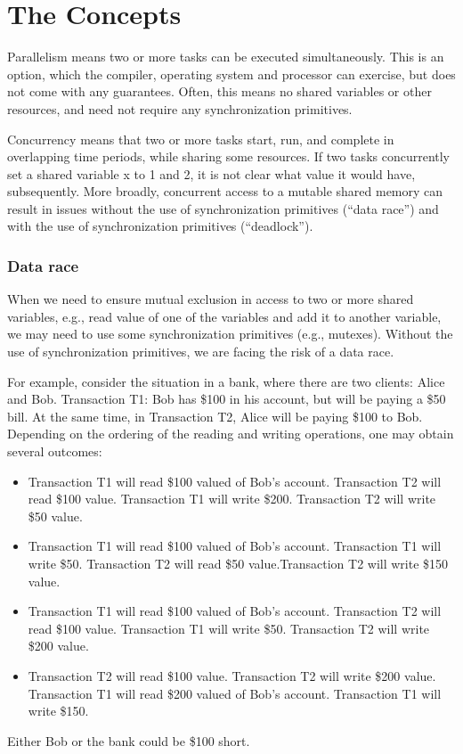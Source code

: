 \chapter{The Concepts}
\label{ch:concepts}

Parallelism means two or more tasks can be executed simultaneously. This is an option, which the compiler, operating system and processor can exercise, but does not come with any guarantees. 
Often, this means no shared variables or other resources, and need not require any synchronization primitives.

Concurrency means that two or more tasks start, run, and complete in overlapping time periods, while sharing some resources. 
If two tasks concurrently set a shared variable x to 1 and 2, it is not clear what value it would have, subsequently.
More broadly, concurrent access to a mutable shared memory can result in issues without the use of synchronization 
primitives (``data race'') and with the use of synchronization primitives (``deadlock'').

\subsection{Data race}

When we need to ensure mutual exclusion in access to two or more shared variables, 
e.g., read value of one of the variables and add it to another variable, 
we may need to use some synchronization primitives (e.g., mutexes).
Without the use of synchronization primitives, we are facing the risk of a data race. 

For example, consider the situation in a bank, where there are two clients:
Alice and Bob. 
Transaction T1: Bob has \$100 in his account, but will be paying a \$50 bill. 
At the same time, in Transaction T2, Alice will be paying \$100 to Bob.
Depending on the ordering of the reading and writing operations, one may obtain several outcomes:
\begin{itemize}
\item Transaction T1 will read \$100 valued of Bob's account. Transaction T2 will read \$100 value.
 Transaction T1 will write \$200. Transaction T2 will write \$50 value.
\item Transaction T1 will read \$100 valued of Bob's account. 
 Transaction T1 will write \$50. Transaction T2 will read \$50 value.Transaction T2 will write \$150 value.
\item Transaction T1 will read \$100 valued of Bob's account. Transaction T2 will read \$100 value.
 Transaction T1 will write \$50. Transaction T2 will write \$200 value.
\item Transaction T2 will read \$100 value. Transaction T2 will write \$200 value.
  Transaction T1 will read \$200 valued of Bob's account.  Transaction T1 will write \$150.  
\end{itemize}
Either Bob or the bank could be \$100 short. 

